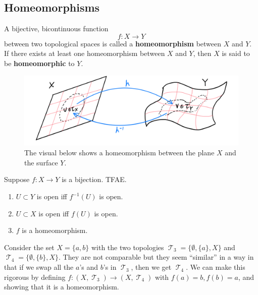 \documentclass{article}
\DeclareMathOperator{\T}{\mathscr{T}}
\begin{document}
  \subsection{Homeomorphisms}

    \begin{definition}[Homeomorphism]
      A bijective, bicontinuous function 
      \begin{equation}
        f: X \longrightarrow Y
      \end{equation}
      between two topological spaces is called a \textbf{homeomorphism} between $X$ and $Y$. If there exists at least one homeomorphism between $X$ and $Y$, then $X$ is said to be \textbf{homeomorphic} to $Y$. 

      \begin{figure}[H]
        \centering 
        \includegraphics[scale=0.25]{img/Homeomorphism_of_Plane.PNG}
        \caption{The visual below shows a homeomorphism between the plane $X$ and the surface $Y$.}
        \label{fig:homeomorphism_plane}
      \end{figure}
    \end{definition}

    \begin{theorem}
      Suppose $f: X \rightarrow Y$ is a bijection. TFAE. 
      \begin{enumerate}
        \item $U \subset Y$ is open iff $f^{-1} (U)$ is open. 
        \item $U \subset X$ is open iff $f(U)$ is open. 
        \item $f$ is a homeomorphism. 
      \end{enumerate}
    \end{theorem} 

    \begin{example}
      Consider the set $X = \{a, b\}$ with the two topologies $\T_3 = \{\emptyset, \{a\}, X\}$ and $\T_4 = \{\emptyset, \{b\}, X\}$. They are not comparable but they seem ``similar'' in a way in that if we swap all the $a$'s and $b$'s in $\T_3$, then we get $\T_4$. We can make this rigorous by defining $f: (X, \T_3) \rightarrow (X, \T_4)$ with $f(a) = b, f(b) = a$, and showing that it is a homeomorphism. 
    \end{example}
\end{document}
